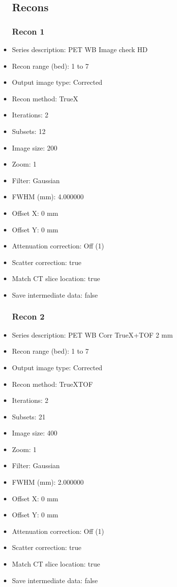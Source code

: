 \documentclass[12pt]{article}
\begin{document}
\begin{itemize}
\subsection{Recons}
\subsubsection{Recon 1}
\item Series description: PET WB Image check HD
\item Recon range (bed): 1 to 7
\item Output image type: Corrected
\item Recon method: TrueX
\item Iterations: 2
\item Subsets: 12
\item Image size: 200
\item Zoom: 1
\item Filter: Gaussian
\item FWHM (mm): 4.000000
\item Offset X: 0 mm
\item Offset Y: 0 mm
\item Attenuation correction: Off (1)
\item Scatter correction: true
\item Match CT slice location: true
\item Save intermediate data: false
\subsubsection{Recon 2}
\item Series description: PET WB Corr TrueX+TOF 2 mm
\item Recon range (bed): 1 to 7
\item Output image type: Corrected
\item Recon method: TrueXTOF
\item Iterations: 2
\item Subsets: 21
\item Image size: 400
\item Zoom: 1
\item Filter: Gaussian
\item FWHM (mm): 2.000000
\item Offset X: 0 mm
\item Offset Y: 0 mm
\item Attenuation correction: Off (1)
\item Scatter correction: true
\item Match CT slice location: true
\item Save intermediate data: false

\end{itemize}
\end{document}
